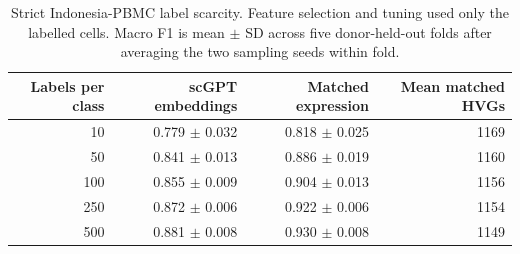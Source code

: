 \begin{table}[H]
\centering
\caption{Strict Indonesia-PBMC label scarcity. Feature selection and tuning used only the labelled cells. Macro F1 is mean $\pm$ SD across five donor-held-out folds after averaging the two sampling seeds within fold.}
\label{tab:scarcity}
\small
\begin{tabular}{rrrr}
\toprule
Labels per class & scGPT embeddings & Matched expression & Mean matched HVGs \\
\midrule
10 & 0.779 $\pm$ 0.032 & 0.818 $\pm$ 0.025 & 1169 \\
50 & 0.841 $\pm$ 0.013 & 0.886 $\pm$ 0.019 & 1160 \\
100 & 0.855 $\pm$ 0.009 & 0.904 $\pm$ 0.013 & 1156 \\
250 & 0.872 $\pm$ 0.006 & 0.922 $\pm$ 0.006 & 1154 \\
500 & 0.881 $\pm$ 0.008 & 0.930 $\pm$ 0.008 & 1149 \\
\bottomrule
\end{tabular}
\end{table}
